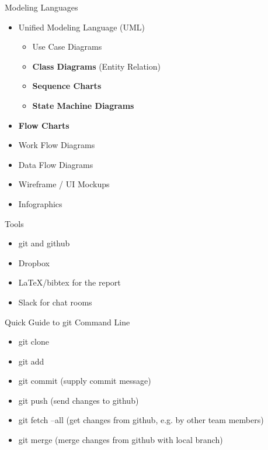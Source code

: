 \documentclass[hyperref={pdfpagelabels=false}, aspectratio=1610]{beamer}
\begin{document}
\begin{frame}
\begin{block}{Modeling Languages}
 \begin{itemize}
  \item Unified Modeling Language (UML)
  \begin{itemize}
	\item Use Case Diagrams
  	\item \textbf{Class Diagrams} (Entity Relation)
	\item \textbf{Sequence Charts}
	\item \textbf{State Machine Diagrams}
  \end{itemize}
  \item \textbf{Flow Charts}
  \item Work Flow Diagrams
  \item Data Flow Diagrams
  \item Wireframe / UI Mockups
  \item Infographics
 \end{itemize}
\end{block}
\end{frame}


\begin{frame}
\begin{block}{Tools}
 \begin{itemize}
  \item git and github
  \item Dropbox
  \item LaTeX/bibtex for the report
  \item Slack for chat rooms
 \end{itemize}
\end{block}
\end{frame}

\begin{frame}
\begin{block}{Quick Guide to git Command Line}
 \begin{itemize}
  \item git clone 
  \item git add 
  \item git commit \quad (supply commit message)
  \item git push \quad (send changes to github)
  \item git fetch --all \quad (get changes from github, e.g. by other team members)
  \item git merge \quad (merge changes from github with local branch)
 \end{itemize}
\end{block}
\end{frame}
\end{document}
